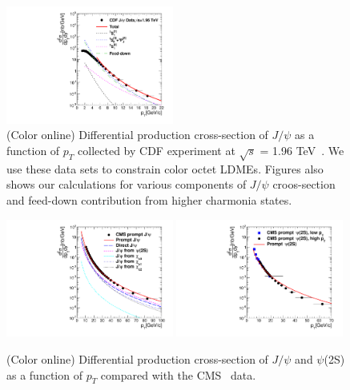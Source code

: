 \documentclass[aps,prc,preprint,superscriptaddress,showpacs,showkeys,amsmath]{revtex4-1}
\begin{document}
\begin{figure}
\includegraphics[width=0.49\textwidth]{Figures/JPsi/CDF_196TeV_D2NDPtDy_PromptJPsi_Y0025_Pt.pdf}
\caption{(Color online) Differential production cross-section of $J/\psi$ as a function of $p_{T}$ 
collected by CDF experiment at $\sqrt{s}$ = 1.96 TeV~\cite{Acosta:2004yw}. 
We use these data sets to constrain color octet LDMEs. Figures also shows our calculations for various components 
of $J/\psi$ croos-section and feed-down contribution from higher charmonia states.}
\label{Fig:LDMEJPsiCDF}
\end{figure}


\begin{figure}
\includegraphics[width=0.49\textwidth]{Fig1a_PromptJPsi_CMS_Y0012_S7TeV.pdf}
\includegraphics[width=0.49\textwidth]{Fig1b_Psi2S_CMS_Y012_S7TeV.pdf}
\caption{(Color online) Differential production cross-section of $J/\psi$ and $\psi$(2S) as a function of $p_{T}$ compared 
  with the CMS~\cite{Chatrchyan:2011kc,Khachatryan:2015rra} data.}
\label{Fig:SigmaPsi}
\end{figure}
\end{document}
